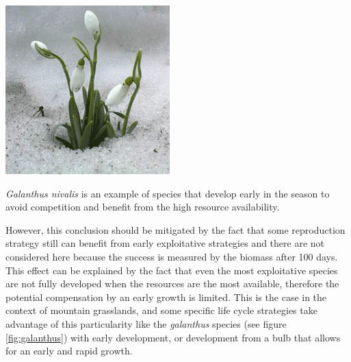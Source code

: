 \begin{marginfigure}
\includegraphics[scale=1]{./2_PP/Figures/Variable/GalanthusNivalis.png}
\caption[\textit{Galanthus nivalis}]{\textit{Galanthus nivalis} is an example of species that develop early in the season to avoid competition and benefit from the high resource availability.}
\end{marginfigure}

However, this conclusion should be mitigated by the fact that some reproduction strategy still can benefit from early exploitative strategies and there are not considered here because the success is measured by the biomass after 100 days. This effect can be explained by the fact that even the most exploitative species are not fully developed when the resources are the most available, therefore the potential compensation by an early growth is limited. This is the case in the context of mountain grasslands, and some specific life cycle strategies take advantage of this particularity like the \textit{galanthus} species (see figure \ref{fig:galanthus}) with early development\parencite{schroder_modelling_2014}, or development from a bulb that allows for an early and rapid growth.


